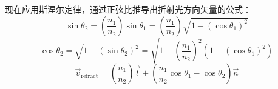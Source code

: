 现在应用斯涅尔定律，通过正弦比推导出折射光方向矢量的公式：  
\[
\sin \theta_2 = \left( \frac{n_1}{n_2} \right) \sin \theta_1 = \left( \frac{n_1}{n_2} \right) \sqrt{1 - \left( \cos \theta_1 \right)^2}~
\]
\[
\cos \theta_2 = \sqrt{1 - (\sin \theta_2)^2} = \sqrt{1 - \left( \frac{n_1}{n_2} \right)^2 \left( 1 - \left( \cos \theta_1 \right)^2 \right)}~
\]
\[
\vec{v}_{\text{refract}} = \left( \frac{n_1}{n_2} \right) \vec{l} + \left( \frac{n_1}{n_2} \cos \theta_1 - \cos \theta_2 \right) \vec{n}~
\]

